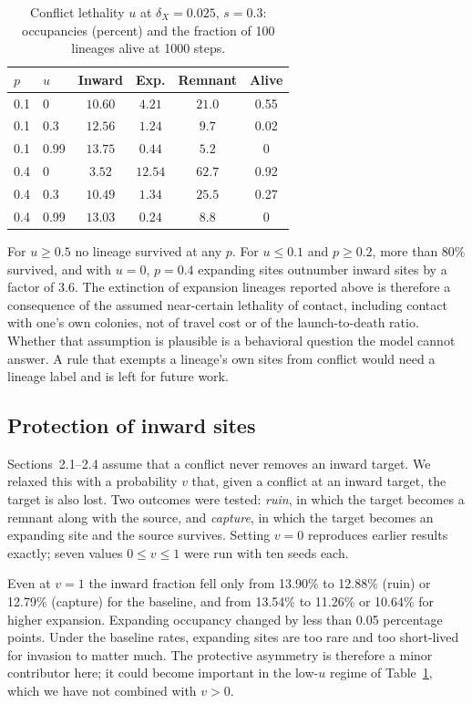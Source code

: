 \documentclass[10pt,twocolumn]{article}
\begin{document}
\begin{table}[ht]
\centering
\caption{Conflict lethality $u$ at $\delta_X=0.025$, $s=0.3$: occupancies
(percent) and the fraction of 100 lineages alive at 1000 steps.}
\setlength{\tabcolsep}{3pt}
\begin{tabular}{llcccc}
\toprule
$p$ & $u$ & Inward & Exp. & Remnant & Alive\\
\midrule
0.1 & 0 & $10.60$ & $4.21$ & $21.0$ & 0.55\\
0.1 & 0.3 & $12.56$ & $1.24$ & $9.7$ & 0.02\\
0.1 & 0.99 & $13.75$ & $0.44$ & $5.2$ & 0\\
0.4 & 0 & $3.52$ & $12.54$ & $62.7$ & 0.92\\
0.4 & 0.3 & $10.49$ & $1.34$ & $25.5$ & 0.27\\
0.4 & 0.99 & $13.03$ & $0.24$ & $8.8$ & 0\\
\bottomrule
\end{tabular}
\label{tab:conflict}
\end{table}

For $u\ge0.5$ no lineage survived at any $p$. For $u\le0.1$ and
$p\ge0.2$, more than 80\% survived, and with $u=0$, $p=0.4$ expanding
sites outnumber inward sites by a factor of 3.6. The extinction of
expansion lineages reported above is therefore a consequence of the
assumed near-certain lethality of contact, including contact with
one's own colonies, not of travel cost or of the launch-to-death ratio.
Whether that assumption is plausible is a behavioral question the model
cannot answer. A rule that exempts a lineage's own sites from conflict
would need a lineage label and is left for future work.

\subsection{Protection of inward sites}
Sections~2.1--2.4 assume that a conflict never removes an inward
target. We relaxed this with a probability $v$ that, given a conflict
at an inward target, the target is also lost. Two outcomes were tested:
\emph{ruin}, in which the target becomes a remnant along with the
source, and \emph{capture}, in which the target becomes an expanding
site and the source survives. Setting $v=0$ reproduces earlier results
exactly; seven values $0\le v\le1$ were run with ten seeds each.

Even at $v=1$ the inward fraction fell only from 13.90\% to 12.88\%
(ruin) or 12.79\% (capture) for the baseline, and from 13.54\% to
11.26\% or 10.64\% for higher expansion. Expanding occupancy changed
by less than 0.05 percentage points. Under the baseline rates,
expanding sites are too rare and too short-lived for invasion to matter
much. The protective asymmetry is therefore a minor contributor here;
it could become important in the low-$u$ regime of
Table~\ref{tab:conflict}, which we have not combined with $v>0$.
\end{document}
